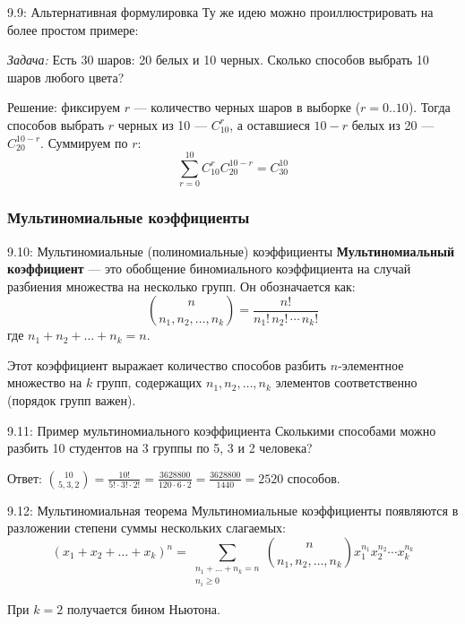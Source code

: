 \documentclass[a4paper,12pt]{article}
\begin{document}
	\begin{remarkbox}{9.9: Альтернативная формулировка}
		Ту же идею можно проиллюстрировать на более простом примере:
		
		\textit{Задача:} Есть 30 шаров: 20 белых и 10 черных. Сколько способов выбрать 10 шаров любого цвета?
		
		Решение: фиксируем $r$ — количество черных шаров в выборке ($r = 0..10$). Тогда способов выбрать $r$ черных из 10 — $C_{10}^r$, а оставшиеся $10-r$ белых из 20 — $C_{20}^{10-r}$. Суммируем по $r$:
		\[ \sum_{r=0}^{10} C_{10}^r C_{20}^{10-r} = C_{30}^{10} \]
	\end{remarkbox}
	
	\subsubsection{Мультиномиальные коэффициенты}
	
	\begin{definitionbox}{9.10: Мультиномиальные (полиномиальные) коэффициенты}
		\textbf{Мультиномиальный коэффициент} — это обобщение биномиального коэффициента на случай разбиения множества на несколько групп. Он обозначается как:
		\[ \binom{n}{n_1, n_2, \dots, n_k} = \frac{n!}{n_1! \, n_2! \, \cdots \, n_k!} \]
		где $n_1 + n_2 + \dots + n_k = n$.
		
		Этот коэффициент выражает количество способов разбить $n$-элементное множество на $k$ групп, содержащих $n_1, n_2, \dots, n_k$ элементов соответственно (порядок групп важен).
	\end{definitionbox}
	
	\begin{examplebox}{9.11: Пример мультиномиального коэффициента}
		Сколькими способами можно разбить 10 студентов на 3 группы по 5, 3 и 2 человека?
		
		Ответ: $\binom{10}{5, 3, 2} = \frac{10!}{5! \cdot 3! \cdot 2!} = \frac{3628800}{120 \cdot 6 \cdot 2} = \frac{3628800}{1440} = 2520$ способов.
	\end{examplebox}
	
	\begin{theorembox}{9.12: Мультиномиальная теорема}
		Мультиномиальные коэффициенты появляются в разложении степени суммы нескольких слагаемых:
		\[ (x_1 + x_2 + \dots + x_k)^n = \sum_{\substack{n_1+\dots+n_k=n \\ n_i \ge 0}} \binom{n}{n_1, n_2, \dots, n_k} x_1^{n_1} x_2^{n_2} \cdots x_k^{n_k} \]
		
		При $k=2$ получается бином Ньютона.
	\end{theorembox}
	
\end{document}
